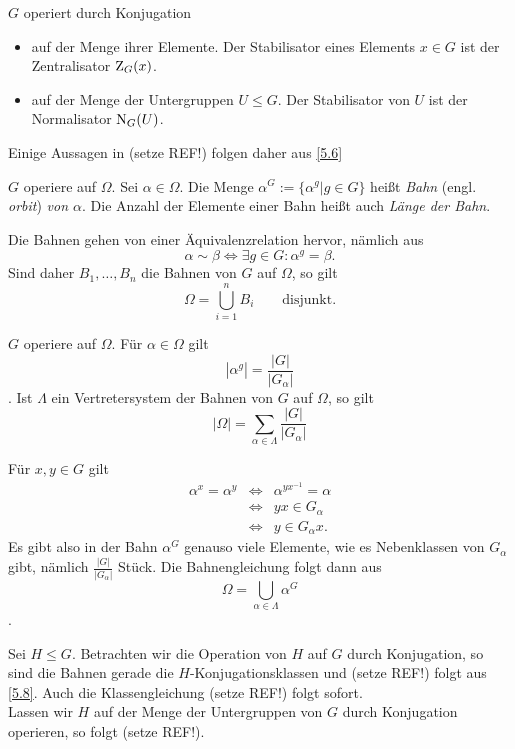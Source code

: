 \begin{bemerkung*}
 $G$ operiert durch Konjugation 
\begin{itemize}
 \item auf der Menge ihrer Elemente. Der Stabilisator eines Elements $x\in G$ ist der Zentralisator $\operatorname{Z}_G(x)$.
 \item auf der Menge der Untergruppen $U\leq G$. Der Stabilisator von $U$ ist der Normalisator $\operatorname{N}_G(U)$.
\end{itemize}
Einige Aussagen in (setze REF!) folgen daher aus \ref{5.6}
\end{bemerkung*}

\begin{definition}[Bahn]
$G$ operiere auf $\Omega$. Sei $\alpha \in \Omega$. Die Menge $\alpha^G:=\lbrace \alpha^g|g\in G\rbrace$ hei\ss{}t \emph{Bahn} (engl. \emph{orbit}) \emph{von $\alpha$}. Die Anzahl der Elemente einer Bahn hei\ss{}t auch \emph{L\"ange der Bahn}.
\end{definition}

\begin{bemerkung*}
 Die Bahnen gehen von einer \"Aquivalenzrelation hervor, n\"amlich aus $$\alpha \sim \beta \Longleftrightarrow \exists g\in G : \alpha^g =\beta.$$
Sind daher $B_1,\ldots,B_n$ die Bahnen von $G$ auf $\Omega$, so gilt $$\Omega=\bigcup_{i=1}^n B_i \qquad\mbox{disjunkt}.$$
\end{bemerkung*}

\begin{satz}[Bahnengleichung] 
\label{5.8}
 $G$ operiere auf $\Omega$. F\"ur $\alpha\in \Omega$ gilt $$|\alpha^g|=\frac{|G|}{|G_\alpha|}$$. Ist $\Lambda$ ein Vertretersystem der Bahnen von $G$ auf $\Omega$, so gilt \begin{equation}
 |\Omega|=\sum_{\alpha\in\Lambda}\frac{|G|}{|G_\alpha|}\tag{Bahnengleichung}
\end{equation}

\end{satz}

\begin{beweis}
 F\"ur $x,y\in G$ gilt
\begin{eqnarray*}
 \alpha^x=\alpha^y &\Longleftrightarrow& \alpha^{yx^{-1}}=\alpha \\&\Longleftrightarrow& yx\in G_\alpha \\&\Longleftrightarrow& y\in G_\alpha x.
\end{eqnarray*}
Es gibt also in der Bahn $\alpha^G$ genauso viele Elemente, wie es Nebenklassen von $G_\alpha$ gibt, n\"amlich $\frac{|G|}{|G_\alpha|}$ St\"uck. Die Bahnengleichung folgt dann aus $$\Omega=\bigcup_{\alpha\in\Lambda}\alpha^G$$.
\end{beweis}
\begin{bemerkung*}
 Sei $H\leq G$. Betrachten wir die Operation von $H$ auf $G$ durch Konjugation, so sind die Bahnen gerade die $H$-Konjugationsklassen und (setze REF!) folgt aus \ref{5.8}. Auch die Klassengleichung (setze REF!) folgt sofort.\\
Lassen wir $H$ auf der Menge der Untergruppen von $G$ durch Konjugation operieren, so folgt (setze REF!).
\end{bemerkung*}

